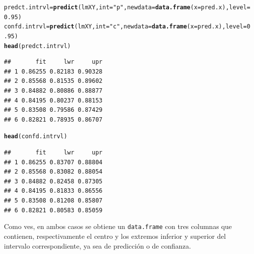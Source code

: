 \documentclass[10pt,a4paper]{article}\usepackage[]{graphicx}\usepackage[]{color}
\makeatletter
\newcommand{\hlnum}[1]{\textcolor[rgb]{0.686,0.059,0.569}{#1}}%
\newcommand{\hlstr}[1]{\textcolor[rgb]{0.192,0.494,0.8}{#1}}%
\newcommand{\hlstd}[1]{\textcolor[rgb]{0.345,0.345,0.345}{#1}}%
\newcommand{\hlkwb}[1]{\textcolor[rgb]{0.69,0.353,0.396}{#1}}%
\newcommand{\hlkwc}[1]{\textcolor[rgb]{0.333,0.667,0.333}{#1}}%
\newcommand{\hlkwd}[1]{\textcolor[rgb]{0.737,0.353,0.396}{\textbf{#1}}}%
\newenvironment{kframe}{%
 \def\at@end@of@kframe{}%
 \ifinner\ifhmode%
  \def\at@end@of@kframe{\end{minipage}}%
  \begin{minipage}{\columnwidth}%
 \fi\fi%
 \def\FrameCommand##1{\hskip\@totalleftmargin \hskip-\fboxsep
 \colorbox{shadecolor}{##1}\hskip-\fboxsep
     \hskip-\linewidth \hskip-\@totalleftmargin \hskip\columnwidth}%
 \MakeFramed {\advance\hsize-\width
   \@totalleftmargin\z@ \linewidth\hsize
   \@setminipage}}%
 {\par\unskip\endMakeFramed%
 \at@end@of@kframe}
\newenvironment{knitrout}{}{} %
\newcounter {cont01}
\makeatother
\begin{document}
\begin{knitrout}
\color{fgcolor}\begin{kframe}
\begin{alltt}
\hlstd{predct.intrvl} \hlkwb{=} \hlkwd{predict}\hlstd{(lmXY,} \hlkwc{int}\hlstd{=}\hlstr{"p"}\hlstd{,} \hlkwc{newdata}\hlstd{=}\hlkwd{data.frame}\hlstd{(}\hlkwc{x} \hlstd{= pred.x),} \hlkwc{level}\hlstd{=}\hlnum{0.95}\hlstd{)}
\hlstd{confd.intrvl} \hlkwb{=} \hlkwd{predict}\hlstd{(lmXY,} \hlkwc{int}\hlstd{=}\hlstr{"c"}\hlstd{,} \hlkwc{newdata}\hlstd{=}\hlkwd{data.frame}\hlstd{(}\hlkwc{x} \hlstd{= pred.x),} \hlkwc{level}\hlstd{=}\hlnum{0.95}\hlstd{)}
\hlkwd{head}\hlstd{(predct.intrvl)}
\end{alltt}
\begin{verbatim}
##       fit     lwr     upr
## 1 0.86255 0.82183 0.90328
## 2 0.85568 0.81535 0.89602
## 3 0.84882 0.80886 0.88877
## 4 0.84195 0.80237 0.88153
## 5 0.83508 0.79586 0.87429
## 6 0.82821 0.78935 0.86707
\end{verbatim}
\begin{alltt}
\hlkwd{head}\hlstd{(confd.intrvl)}
\end{alltt}
\begin{verbatim}
##       fit     lwr     upr
## 1 0.86255 0.83707 0.88804
## 2 0.85568 0.83082 0.88054
## 3 0.84882 0.82458 0.87305
## 4 0.84195 0.81833 0.86556
## 5 0.83508 0.81208 0.85807
## 6 0.82821 0.80583 0.85059
\end{verbatim}
\end{kframe}
\end{knitrout}
Como ves, en ambos casos se obtiene un {\tt data.frame} con tres columnas que contienen, respectivamente el centro y los extremos inferior y superior del intervalo correspondiente, ya sea de predicción o de confianza.
\end{document}
